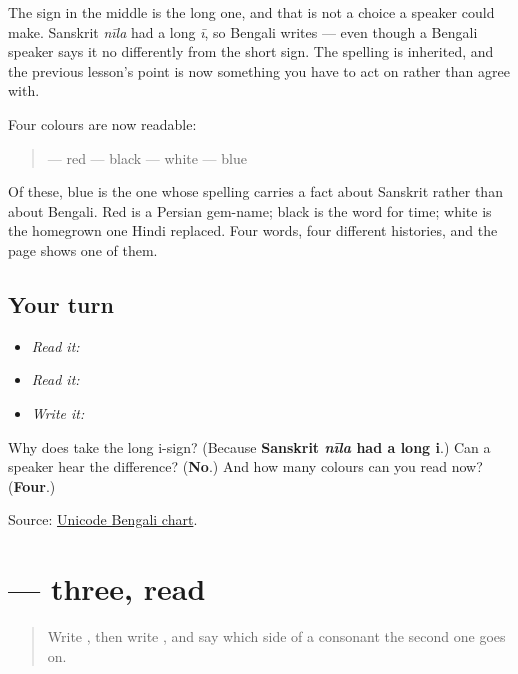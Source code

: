 The sign in the middle is the long one, and that is not a choice a speaker could make. Sanskrit \emph{nīla} had a long \emph{ī}, so Bengali writes \textbf{} — even though a Bengali speaker says it no differently from the short sign. The spelling is inherited, and the previous lesson's point is now something you have to act on rather than agree with.

Four colours are now readable:

\begin{quote}
\textbf{} — red \textbf{} — black \textbf{} — white \textbf{} — blue
\end{quote}

Of these, blue is the one whose spelling carries a fact about Sanskrit rather than about Bengali. Red is a Persian gem-name; black is the word for time; white is the homegrown one Hindi replaced. Four words, four different histories, and the page shows one of them.

\subsection*{Your turn}
\begin{itemize}
\raggedright
  \item \emph{Read it:} 
  \item \emph{Read it:}    
  \item \emph{Write it:} 
\end{itemize}

\begin{tcolorbox}[breakable,colback=teal!4,colframe=teal!35!black,title={Before you move on}]
Why does \textbf{} take the long i-sign? (Because \textbf{Sanskrit \emph{nīla} had a long i}.) Can a speaker hear the difference? (\textbf{No}.) And how many colours can you read now? (\textbf{Four}.)

Source: \href{https://www.unicode.org/charts/PDF/U0980.pdf}{Unicode Bengali chart}.
\end{tcolorbox}
\section[\texorpdfstring{\bn{তিন} (tin)}{তিন (tin)}]{ — three, read}

\label{lesson:BN-W02-tin-read}



\begin{quote}
Write \textbf{}, then write \textbf{}, and say which side of a consonant the second one goes on.
\end{quote}

